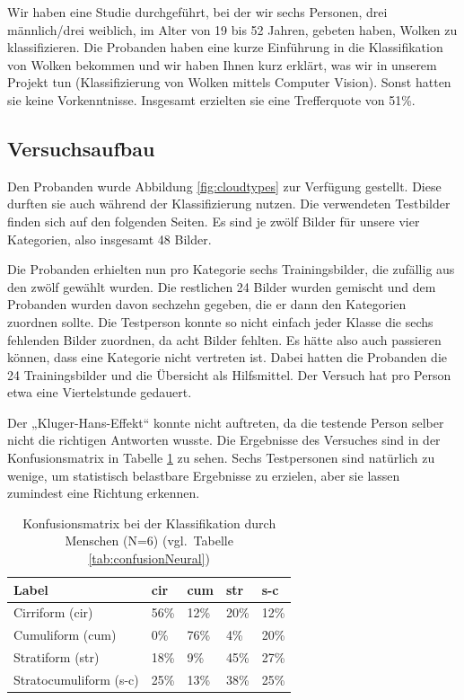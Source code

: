 \documentclass[a4,german]{article}
\begin{document}
Wir haben eine Studie durchgeführt, bei der wir sechs Personen, drei männlich/drei weiblich, im Alter von 19 bis 52 Jahren, gebeten haben, Wolken zu klassifizieren.
Die Probanden haben eine kurze Einführung in die Klassifikation von Wolken bekommen und wir haben Ihnen kurz erklärt, was wir in unserem Projekt tun (Klassifizierung von Wolken mittels Computer Vision).
Sonst hatten sie keine Vorkenntnisse.
Insgesamt erzielten sie eine Trefferquote von 51\%.


\subsection{Versuchsaufbau}
\label{anhang:cloudgame}

Den Probanden wurde Abbildung \ref{fig:cloudtypes} zur Verfügung gestellt.
Diese durften sie auch während der Klassifizierung nutzen.
Die verwendeten Testbilder finden sich auf den folgenden Seiten.
Es sind je zwölf Bilder für unsere vier Kategorien, also insgesamt 48 Bilder.

Die Probanden erhielten nun pro Kategorie sechs Trainingsbilder, die zufällig aus den zwölf gewählt wurden.
Die restlichen 24 Bilder wurden gemischt und dem Probanden wurden davon sechzehn gegeben, die er dann den Kategorien zuordnen sollte.
Die Testperson konnte so nicht einfach jeder Klasse die sechs fehlenden Bilder zuordnen, da acht Bilder fehlten.
Es hätte also auch passieren können, dass eine Kategorie nicht vertreten ist.
Dabei hatten die Probanden die 24 Trainingsbilder und die Übersicht als Hilfsmittel.
Der Versuch hat pro Person etwa eine Viertelstunde gedauert.

Der „Kluger-Hans-Effekt“ konnte nicht auftreten, da die testende Person selber nicht die richtigen Antworten wusste.
Die Ergebnisse des Versuches sind in der Konfusionsmatrix in Tabelle \ref{tab:humanConfusion} zu sehen.
Sechs Testpersonen sind natürlich zu wenige, um statistisch belastbare Ergebnisse zu erzielen, aber sie lassen zumindest eine Richtung erkennen.

\begin{table}[h!]
    \centering
    \begin{tabular}{| l | l | l | l | l |}
        \hline
        Label & cir & cum & str & s-c \\ \hline
        Cirriform (cir) & 56\% & 12\% & 20\% & 12\% \\ \hline
        Cumuliform (cum) & 0\% & 76\% & 4\% & 20\% \\ \hline
        Stratiform (str) & 18\% & 9\% & 45\% & 27\% \\ \hline
        Stratocumuliform (s-c) & 25\% & 13\% & 38\% & 25\% \\ \hline
    \end{tabular}
    \caption{Konfusionsmatrix bei der Klassifikation durch Menschen (N=6) (vgl.\ Tabelle \ref{tab:confusionNeural})}
    \label{tab:humanConfusion}
\end{table}


\end{document}
